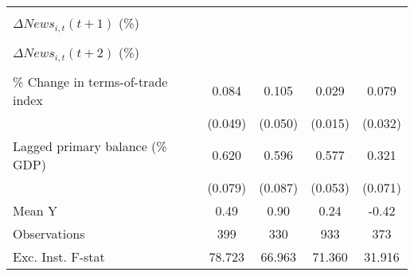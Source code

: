 {\begin{tabular}{l*{4}{c}}
                    &                     &                     &                     &                     \\
\addlinespace
$ \Delta News_{i,t}(t+1)$ (\%)&                     &                     &                     &                     \\
                    &                     &                     &                     &                     \\
\addlinespace
$ \Delta News_{i,t}(t+2)$ (\%)&                     &                     &                     &                     \\
                    &                     &                     &                     &                     \\
\addlinespace
\% Change in terms-of-trade index&       0.084\sym{*}  &       0.105\sym{**} &       0.029\sym{*}  &       0.079\sym{**} \\
                    &     (0.049)         &     (0.050)         &     (0.015)         &     (0.032)         \\
\addlinespace
Lagged primary balance (\% GDP)&       0.620\sym{***}&       0.596\sym{***}&       0.577\sym{***}&       0.321\sym{***}\\
                    &     (0.079)         &     (0.087)         &     (0.053)         &     (0.071)         \\
\midrule
Mean Y              &        0.49         &        0.90         &        0.24         &       -0.42         \\
Observations        &         399         &         330         &         933         &         373         \\
Exc. Inst. F-stat   &      78.723         &      66.963         &      71.360         &      31.916         \\
\bottomrule
\end{tabular}
}
